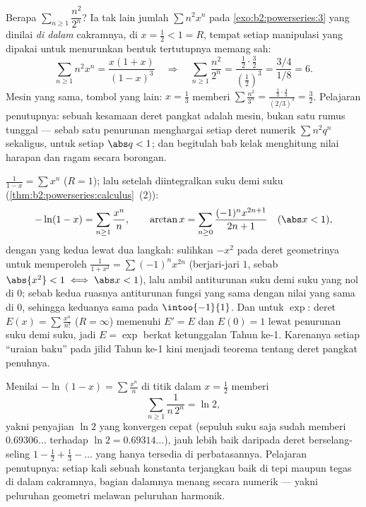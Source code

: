 \begin{example}\label{ex:b2:powerseries:evaluate}
Berapa $\sum_{n\geq1}\dfrac{n^2}{2^n}$? Ia tak lain jumlah
$\sum n^2x^n$ pada \cref{exo:b2:powerseries:3} yang dinilai
\emph{di dalam} cakramnya, di $x = \frac12 < 1 = R$, tempat setiap
manipulasi yang dipakai untuk menurunkan bentuk tertutupnya memang sah:
\[
\sum_{n\geq1} n^2x^n = \frac{x(1+x)}{(1-x)^3}
\quad\Longrightarrow\quad
\sum_{n\geq1}\frac{n^2}{2^n}
= \frac{\frac12\cdot\frac32}{(\frac12)^3}
= \frac{3/4}{1/8} = 6 .
\]
Mesin yang sama, tombol yang lain: $x = \frac13$ memberi
$\sum\frac{n^2}{3^n} = \frac{\frac13\cdot\frac43}{(2/3)^3} =
\frac32$. Pelajaran penutupnya: sebuah kesamaan deret pangkat adalah
mesin, bukan satu rumus tunggal --- sebab satu penurunan menghargai
setiap deret numerik $\sum n^2q^n$ sekaligus, untuk setiap $\abs q < 1$;
dan begitulah bab  kelak menghitung
nilai harapan dan ragam secara borongan.
\end{example}

\begin{example}\label{ex:b2:powerseries:classics}
$\displaystyle\frac{1}{1 - x} = \sum x^n$ ($R = 1$); lalu setelah
diintegralkan suku demi suku (\cref{thm:b2:powerseries:calculus}~(2)):
\[
-\ln(1 - x) = \sum_{n\geq1} \frac{x^n}{n},
\qquad
\arctan x = \sum_{n \geq 0} \frac{(-1)^n x^{2n+1}}{2n+1}
\quad (\abs x < 1),
\]
dengan yang kedua lewat dua langkah: sulihkan $-x^2$ pada deret
geometrinya untuk memperoleh $\frac{1}{1+x^2} = \sum(-1)^nx^{2n}$
(berjari-jari $1$, sebab $\abs{x^2} < 1 \iff \abs x < 1$), lalu ambil
antiturunan suku demi suku yang nol di $0$; sebab kedua ruasnya
antiturunan fungsi yang sama dengan nilai yang sama di $0$,
sehingga keduanya sama pada $\intoo{-1}{1}$. Dan untuk $\exp$:
deret $E(x) = \sum \frac{x^n}{n!}$ ($R = \infty$) memenuhi
$E' = E$ dan $E(0) = 1$ lewat penurunan suku demi suku, jadi $E = \exp$
berkat ketunggalan Tahun ke-1. Karenanya setiap ``uraian baku'' pada
jilid Tahun ke-1 kini menjadi teorema tentang deret pangkat penuhnya.
\end{example}

\begin{example}\label{ex:b2:powerseries:lntwo}
Menilai $-\ln(1-x) = \sum\frac{x^n}{n}$ di titik dalam
$x = \frac12$ memberi
\[
\sum_{n\geq1}\frac{1}{n\,2^n} = \ln 2 ,
\]
yakni penyajian $\ln 2$ yang konvergen cepat (sepuluh suku saja sudah
memberi $0.69306\ldots$ terhadap $\ln 2 = 0.69314\ldots$), jauh
lebih baik daripada deret berselang-seling $1 - \frac12 + \frac13 -
\dots$ yang hanya tersedia di perbatasannya. Pelajaran penutupnya:
setiap kali sebuah konstanta terjangkau baik di tepi maupun tegas
di dalam cakramnya, bagian dalamnya menang secara numerik --- yakni
peluruhan geometri melawan peluruhan harmonik.
\end{example}

